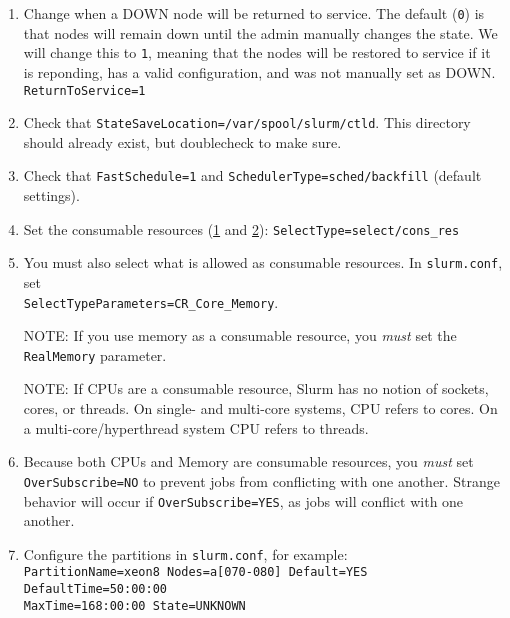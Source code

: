 \begin{enumerate}
\begin{enumerate}
\begin{enumerate}
		\item Change when a DOWN node will be returned to service. The default (\texttt{0}) is that nodes will remain down until the admin manually changes the state. We will change this to \texttt{1}, meaning that the nodes will be restored to service if it is reponding, has a valid configuration, and was not manually set as DOWN. \\
		\texttt{ReturnToService=1}

		\item Check that \texttt{StateSaveLocation=/var/spool/slurm/ctld}. This directory should already exist, but doublecheck to make sure.

		\item Check that \texttt{FastSchedule=1} and \texttt{SchedulerType=sched/backfill} (default settings).
	
		\item Set the consumable resources (\href{https://slurm.schedmd.com/cons_res.html}{1} and \href{https://slurm.schedmd.com/cons_res_share.html}{2}):
		\texttt{SelectType=select/cons\_res}
	
		\item You must also select what is allowed as consumable resources. In \texttt{slurm.conf}, set \\
		\texttt{SelectTypeParameters=CR\_Core\_Memory}. 
	
		NOTE: If you use memory as a consumable resource, you \emph{must} set the \texttt{RealMemory} parameter.
	
		NOTE: If CPUs are a consumable resource, Slurm has no notion of sockets, cores, or threads. On single- and multi-core systems, CPU refers to cores. On a multi-core/hyperthread system CPU refers to threads.
	
		\item Because both CPUs and Memory are consumable resources, you \emph{must} set \texttt{OverSubscribe=NO} to prevent jobs from conflicting with one another. Strange behavior will occur if \texttt{OverSubscribe=YES}, as jobs will conflict with one another. %

		\item Configure the partitions in \texttt{slurm.conf}, for example: \\
		\texttt{PartitionName=xeon8 Nodes=a[070-080] Default=YES DefaultTime=50:00:00 \\ MaxTime=168:00:00 State=UNKNOWN}


\end{enumerate}
\end{enumerate}
\end{enumerate}
